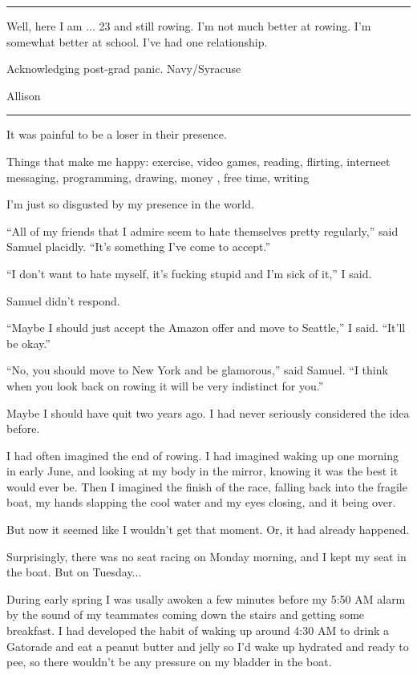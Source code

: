 \plainfancybreak{12pt}{2}{* * *}

Well, here I am ... 23 and still rowing.  I'm not much better at rowing.  I'm
somewhat better at school.  I've had one relationship.


Acknowledging post-grad panic.
Navy/Syracuse

Allison

\plainfancybreak{12pt}{2}{* * *}


It was painful to be a loser in their presence.  

Things that make me happy: exercise, video games, reading, flirting, interneet
messaging, programming, drawing, money , free time, writing

I'm just so disgusted by my presence in the world.

``All of my friends that I admire seem to hate themselves pretty regularly,''
said Samuel placidly.  ``It's something I've come to accept.''

``I don't want to hate myself, it's fucking stupid and I'm sick of it,'' I said.  

Samuel didn't respond.

``Maybe I should just accept the Amazon offer and move to Seattle,'' I said.
``It'll be okay.''

``No, you should move to New York and be glamorous,'' said Samuel.  ``I think
when you look back on rowing it will be very indistinct for you.'' 

Maybe I should have quit two years ago.  I had never seriously considered the
idea before.

I had often imagined the end of rowing.  I had imagined waking up one morning in
early June, and looking at my body in the mirror, knowing it was the best it
would ever be.  Then I imagined  the finish of the race, falling back into the
fragile boat, my hands slapping the cool water and my eyes closing, and it being
over.

But now it seemed like I wouldn't get that moment.  Or, it had already happened.

Surprisingly, there was no seat racing on Monday morning, and I kept my seat in
the boat.  But on Tuesday...

During early spring I was usally awoken a few minutes before my 5:50 AM alarm by
the sound of my teammates coming down the stairs and getting some breakfast.  I
had developed the habit of waking up around 4:30 AM to drink a Gatorade and eat
a peanut butter and jelly so I'd wake up hydrated and ready to pee, so there
wouldn't be any pressure on my bladder in the boat. 

